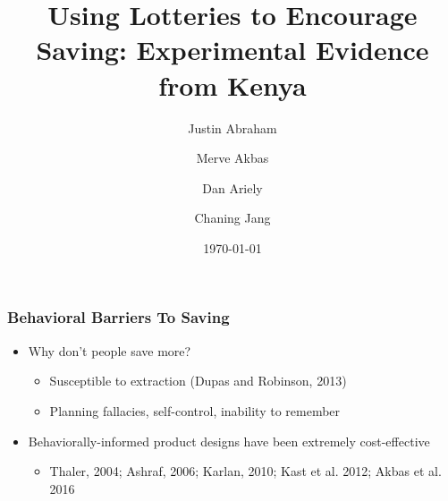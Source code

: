 \documentclass{beamer}
\title[Lottery]{Using Lotteries to Encourage Saving: Experimental Evidence from Kenya}
\author[Abraham, Akbas, Ariely, Jang (2016)]{Justin Abraham \inst{\ddag} \and Merve Akbas \inst{\dag} \and Dan Ariely \inst{\dag} \and Chaning Jang \inst{\ddag}} \institute[]{\inst{\dag} Duke University \and \inst{\ddag} Princeton University}
\date{\today}
\begin{document}
\begin{frame}
\titlepage
\end{frame}


\begin{frame} \frametitle{Behavioral Barriers To Saving} \pause

	\begin{itemize}
	\item Why don't people save more? \pause
		\begin{itemize}
		\item Susceptible to extraction (Dupas and Robinson, 2013) \pause
		\item Planning fallacies, self-control, inability to remember \pause
		\end{itemize}
	\item Behaviorally-informed product designs have been extremely cost-effective
		\begin{itemize}
		\item Thaler, 2004; Ashraf, 2006; Karlan, 2010; Kast et al. 2012; Akbas et al. 2016 \pause
		\end{itemize}
	\end{itemize}

\end{frame}

\end{document}
